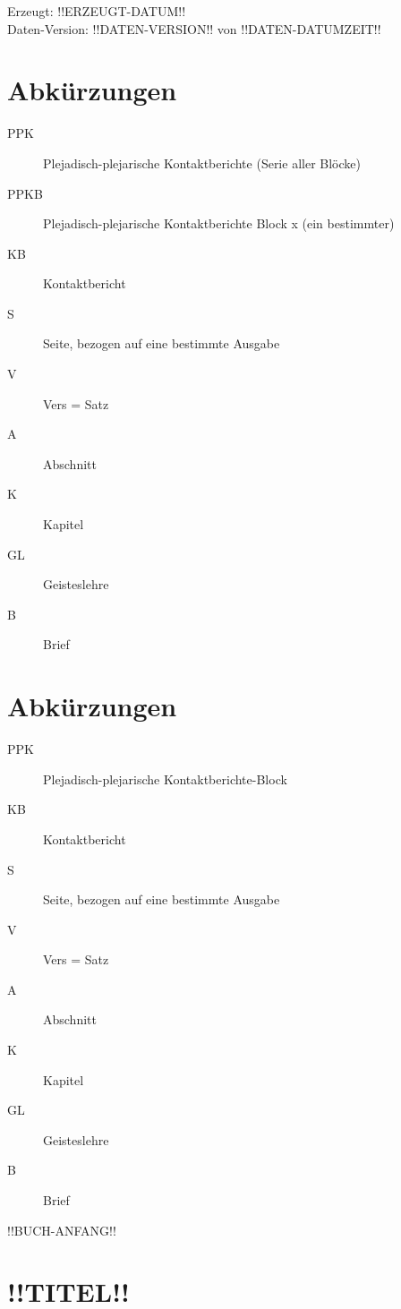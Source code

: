 \documentclass[ngerman,10pt]{book}
\begin{document}
\noindent Erzeugt: !!ERZEUGT-DATUM!! \\
Daten-Version: !!DATEN-VERSION!! von !!DATEN-DATUMZEIT!!

\newpage



\chapter*{Abkürzungen}

\begin{description}
	\item[PPK] Plejadisch-plejarische Kontaktberichte (Serie aller Blöcke)
	\item[PPKB] Plejadisch-plejarische Kontaktberichte Block x (ein bestimmter)
	\item[KB] Kontaktbericht
	\item[S] Seite, bezogen auf eine bestimmte Ausgabe
	\item[V] Vers = Satz
	\item[A] Abschnitt
	\item[K] Kapitel
	\item[GL] Geisteslehre
	\item[B] Brief
\end{description}



\chapter*{Abkürzungen}

\begin{description}
\item[PPK] Plejadisch-plejarische Kontaktberichte-Block
\item[KB] Kontaktbericht
\item[S] Seite, bezogen auf eine bestimmte Ausgabe
\item[V] Vers = Satz
\item[A] Abschnitt
\item[K] Kapitel
\item[GL] Geisteslehre
\item[B] Brief
\end{description}



\tableofcontents



\mainmatter

!!BUCH-ANFANG!!
\chapter{!!TITEL!!}
\end{document}
